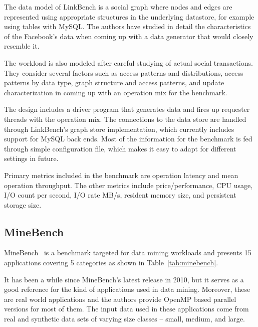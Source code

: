 The data model of LinkBench is a social graph where nodes and edges are represented using appropriate structures in the underlying datastore, for example using tables with MySQL. The authors have studied in detail the characteristics of the Facebook’s data when coming up with a data generator that would closely resemble it. 

The workload is also modeled after careful studying of actual social transactions. They consider several factors such as access patterns and distributions, access patterns by data type, graph structure and access patterns, and update characterization in coming up with an operation mix for the benchmark.

The design includes a driver program that generates data and fires up requester threads with the operation mix. The connections to the data store are handled through LinkBench’s graph store implementation, which currently includes support for MySQL back ends. Most of the information for the benchmark is fed through simple configuration file, which makes it easy to adapt for different settings in future.

Primary metrics included in the benchmark are operation latency and mean operation throughput. The other metrics include price/performance, CPU usage, I/O count per second, I/O rate MB/s, resident memory size, and persistent storage size.

\subsection{MineBench}
MineBench~\cite{minebench} is a benchmark targeted for data mining workloads and presents 15 applications covering 5 categories as shown in Table~\ref{tab:minebench}.


It has been a while since MineBench’s latest release in 2010, but it serves as a good reference for the kind of applications used in data mining. Moreover, these are real world applications and the authors provide OpenMP based parallel versions for most of them. The input data used in these applications come from real and synthetic data sets of varying size classes – small, medium, and large.

